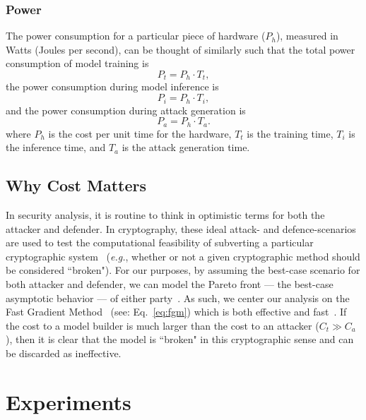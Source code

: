 \documentclass[journal]{IEEEtran}
\newcommand{\cm}[1]{#1}
\begin{document}
\subsubsection{Power}
The power consumption for a particular piece of hardware ($P_h$), measured in Watts (Joules per second), can be thought of similarly such that the total power consumption of model training is
$$
    P_t = P_h \cdot T_t,
    \label{eq:power_training}
$$
the power consumption during model inference is
$$
    P_i = P_h \cdot T_i,
    \label{eq:power_inference}
$$
and the power consumption during attack generation is
$$
    P_a = P_h \cdot T_a.
    \label{eq:power_attack}
$$
where $P_h$ is the cost per unit time for the hardware, $T_t$ is the training time, $T_i$ is the inference time, and $T_a$ is the attack generation time.

\subsection{Why Cost Matters}

 In security analysis, it is  routine to think in optimistic terms for both the attacker and defender. In cryptography, these ideal attack- and defence-scenarios are used to test the computational feasibility of subverting a particular cryptographic system~\cite{kamal2017study,leurent2020sha} (\textit{e.g.}, whether or not a given cryptographic method should be considered ``broken"). For our purposes, by assuming the best-case scenario for both attacker and defender, we can model the Pareto front --- the best-case asymptotic behavior --- of either party~\cite{zitzler2008quality}.
As such, we center our analysis on the Fast Gradient Method~\cite{fgm} (see: Eq.~\ref{eq:fgm}) which is both effective and fast~\cite{meyers}. If the cost to a model builder is much larger than the cost to an attacker ($C_t \gg C_a$), then it is  clear that the model is ``broken" in this cryptographic sense and can be discarded as ineffective. 





\section{Experiments}
\label{experiments}
\end{document}
